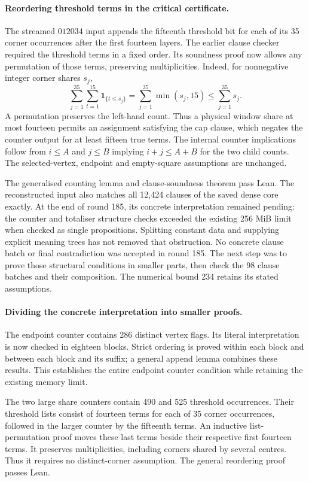 \documentclass[11pt,a4paper]{article}
\theoremstyle{definition}
\theoremstyle{remark}
\begin{document}
\paragraph{Reordering threshold terms in the critical certificate.}
The streamed $012034$ input appends the fifteenth threshold bit for each
of its 35 corner occurrences after the first fourteen layers. The earlier
clause checker required the threshold terms in a fixed order. Its
soundness proof now allows any permutation of those terms, preserving
multiplicities. Indeed, for nonnegative integer corner shares $s_j$,
\[
\sum_{j=1}^{35}\sum_{t=1}^{15}\mathbf{1}_{\{t\le s_j\}}
 =\sum_{j=1}^{35}\min(s_j,15)\le\sum_{j=1}^{35}s_j.
\]
A permutation preserves the left-hand count. Thus a physical window
share at most fourteen permits an assignment satisfying the cap clause,
which negates the counter output for at least fifteen true terms.
The internal counter implications follow from
$i\le A$ and $j\le B$ implying $i+j\le A+B$ for the two child counts.
The selected-vertex, endpoint and empty-square assumptions are unchanged.

The generalised counting lemma and clause-soundness theorem pass Lean.
The reconstructed input also matches all 12,424 clauses of the saved
dense core exactly. At the end of round 185, its concrete interpretation remained
pending: the counter and totaliser structure checks exceeded the existing
256 MiB limit when checked as single propositions. Splitting constant
data and supplying explicit meaning trees has not removed that
obstruction. No concrete clause batch or final contradiction was
accepted in round 185. The next step was to prove those structural
conditions in smaller parts, then check the 98 clause batches and their
composition. The numerical bound 234 retains its stated assumptions.

\paragraph{Dividing the concrete interpretation into smaller proofs.}
The endpoint counter contains 286 distinct vertex flags. Its literal
interpretation is now checked in eighteen blocks. Strict ordering is
proved within each block and between each block and its suffix; a general
append lemma combines these results. This establishes the entire endpoint
counter condition while retaining the existing memory limit.

The two large share counters contain 490 and 525 threshold occurrences.
Their threshold lists consist of fourteen terms for each of 35 corner
occurrences, followed in the larger counter by the fifteenth terms.
An inductive list-permutation proof moves these last terms beside their
respective first fourteen terms. It preserves multiplicities, including
corners shared by several centres. Thus it requires no distinct-corner
assumption. The general reordering proof passes Lean.
\end{document}
